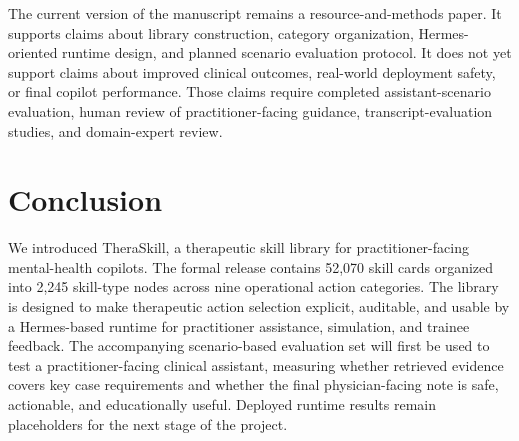 \documentclass[11pt]{article}
\begin{document}
The current version of the manuscript remains a resource-and-methods paper. It supports claims about library construction, category organization, Hermes-oriented runtime design, and planned scenario evaluation protocol. It does not yet support claims about improved clinical outcomes, real-world deployment safety, or final copilot performance. Those claims require completed assistant-scenario evaluation, human review of practitioner-facing guidance, transcript-evaluation studies, and domain-expert review.

\section{Conclusion}

We introduced TheraSkill, a therapeutic skill library for practitioner-facing mental-health copilots. The formal release contains 52,070 skill cards organized into 2,245 skill-type nodes across nine operational action categories. The library is designed to make therapeutic action selection explicit, auditable, and usable by a Hermes-based runtime for practitioner assistance, simulation, and trainee feedback. The accompanying scenario-based evaluation set will first be used to test a practitioner-facing clinical assistant, measuring whether retrieved evidence covers key case requirements and whether the final physician-facing note is safe, actionable, and educationally useful. Deployed runtime results remain placeholders for the next stage of the project.



\end{document}
